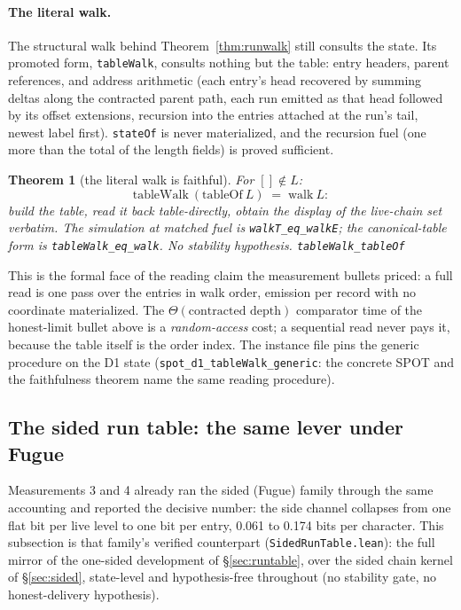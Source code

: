\documentclass[11pt]{article}
\newtheorem{theorem}{Theorem}[section]
\newcommand{\lean}[1]{\texttt{#1}}
\newcommand{\code}[1]{\texttt{#1}}
\begin{document}
\paragraph{The literal walk.} The structural walk behind
Theorem~\ref{thm:runwalk} still consults the state. Its promoted form,
\lean{tableWalk}, consults nothing but the table: entry headers, parent
references, and address arithmetic (each entry's head recovered by
summing deltas along the contracted parent path, each run emitted as
that head followed by its offset extensions, recursion into the entries
attached at the run's tail, newest label first). \lean{stateOf} is
never materialized, and the recursion fuel (one more than the total of
the length fields) is proved sufficient.

\begin{theorem}[the literal walk is faithful]
\label{thm:tablewalk}
For $[] \notin L$:
\[
  \mathrm{tableWalk}\ (\mathrm{tableOf}\ L) \;=\; \mathrm{walk}\ L :
\]
build the table, read it back table-directly, obtain the display of
the live-chain set verbatim. The simulation at matched fuel is
\lean{walkT\_eq\_walkE}; the canonical-table form is
\lean{tableWalk\_eq\_walk}. No stability hypothesis.
\hfill\lean{tableWalk\_tableOf}
\end{theorem}

\noindent This is the formal face of the reading claim the measurement bullets
priced: a full read is one pass over the entries in walk order,
emission per record with no coordinate materialized. The
$\Theta(\text{contracted depth})$ comparator time of the honest-limit
bullet above is a \emph{random-access} cost; a sequential read never
pays it, because the table itself is the order index. The instance file
pins the generic procedure on the D1 state
(\lean{spot\_d1\_tableWalk\_generic}: the concrete SPOT and the
faithfulness theorem name the same reading procedure).

\subsection{The sided run table: the same lever under Fugue}
\label{sec:sidedruntable}

Measurements 3 and 4 already ran the sided (Fugue) family through the
same accounting and reported the decisive number: the side channel
collapses from one flat bit per live level to one bit per entry, 0.061
to 0.174 bits per character. This subsection is that family's verified
counterpart (\code{SidedRunTable.lean}): the full mirror of the
one-sided development of \S\ref{sec:runtable}, over the sided chain
kernel of \S\ref{sec:sided}, state-level and hypothesis-free
throughout (no stability gate, no honest-delivery hypothesis).
\end{document}
